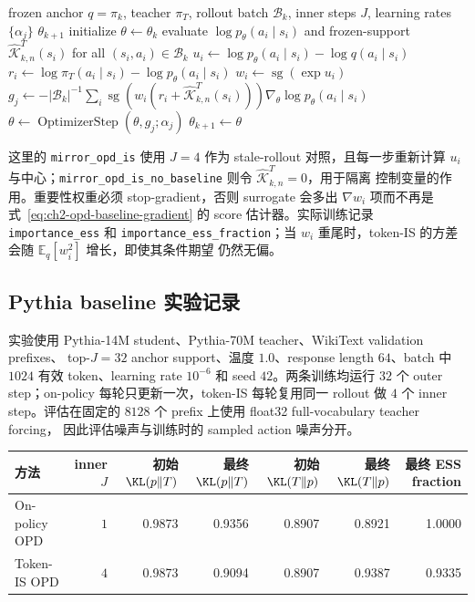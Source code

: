 \begin{algorithm}[ht]
\caption{Token-IS OPD baseline\\{\small\textit{Semantics: 复用 anchor rollout；仅修正 prefix 条件下的 token 测度}}}
\begin{algorithmic}[1]
\Require frozen anchor $q=\pi_k$, teacher $\pi_T$, rollout batch $\mathcal B_k$, inner steps $J$, learning rates $\{\alpha_j\}$
\Ensure $\theta_{k+1}$
\State initialize $\theta\gets\theta_k$
    \State evaluate $\log p_\theta(a_i\mid s_i)$ and frozen-support $\widehat{\mathcal K}_{k,n}^{T}(s_i)$ for all $(s_i,a_i)\in\mathcal B_k$
    \State $u_i\gets\log p_\theta(a_i\mid s_i)-\log q(a_i\mid s_i)$
    \State $r_i\gets\log\pi_T(a_i\mid s_i)-\log p_\theta(a_i\mid s_i)$
    \State $w_i\gets\operatorname{sg}(\exp u_i)$
    \State $g_j\gets-|\mathcal B_k|^{-1}\sum_i\operatorname{sg}(w_i(r_i+\widehat{\mathcal K}_{k,n}^{T}(s_i)))\nabla_\theta\log p_\theta(a_i\mid s_i)$
    \State $\theta\gets\operatorname{OptimizerStep}(\theta,g_j;\alpha_j)$
\EndFor
\State \Return $\theta_{k+1}\gets\theta$
\end{algorithmic}
\end{algorithm}

这里的 \texttt{mirror\_opd\_is} 使用 $J=4$ 作为 stale-rollout 对照，且每一步重新计算
$u_i$ 与中心；\texttt{mirror\_opd\_is\_no\_baseline} 则令 $\widehat{\mathcal K}_{k,n}^{T}=0$，用于隔离
控制变量的作用。重要性权重必须 stop-gradient，否则 surrogate 会多出
$\nabla w_i$ 项而不再是式~\eqref{eq:ch2-opd-baseline-gradient} 的 score
估计器。实际训练记录 \texttt{importance\_ess} 和 \texttt{importance\_ess\_fraction}；当
$w_i$ 重尾时，token-IS 的方差会随 $\mathbb E_q[w_i^2]$ 增长，即使其条件期望
仍然无偏。

\subsection{Pythia baseline 实验记录}
\label{subsec:ch2-opd-baseline-results}

实验使用 Pythia-14M student、Pythia-70M teacher、WikiText validation prefixes、
top-$J=32$ anchor support、温度 $1.0$、response length $64$、batch 中 $1024$
有效 token、learning rate $10^{-6}$ 和 seed $42$。两条训练均运行 $32$ 个 outer
step；on-policy 每轮只更新一次，token-IS 每轮复用同一 rollout 做 $4$ 个 inner
step。评估在固定的 $8128$ 个 prefix 上使用 float32 full-vocabulary teacher forcing，
因此评估噪声与训练时的 sampled action 噪声分开。

\begin{center}
\begin{tabular}{lrrrrrr}
\toprule
方法 & inner $J$ & 初始 $\KL(p\Vert T)$ & 最终 $\KL(p\Vert T)$ & 初始 $\KL(T\Vert p)$ & 最终 $\KL(T\Vert p)$ & 最终 ESS fraction\\
\midrule
On-policy OPD & $1$ & 0.9873 & 0.9356 & 0.8907 & 0.8921 & 1.0000\\
Token-IS OPD & $4$ & 0.9873 & 0.9094 & 0.8907 & 0.9387 & 0.9335\\
\bottomrule
\end{tabular}
\end{center}

